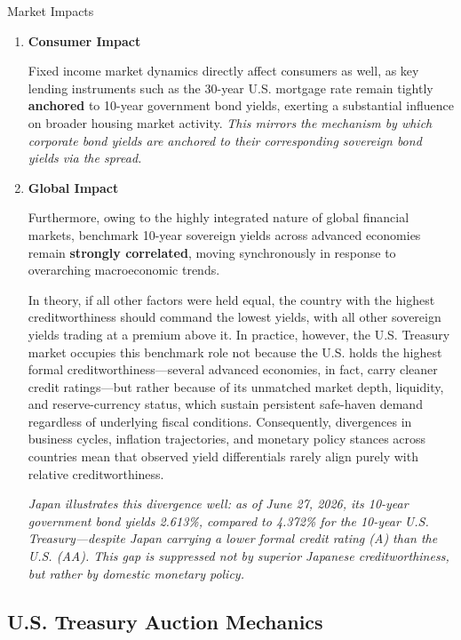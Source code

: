 \documentclass[10pt]{article}
\begin{document}
\begin{core}[label=core:market_impact]{Market Impacts}
\begin{enumerate}
        \item \textbf{Consumer Impact}

        Fixed income market dynamics directly affect consumers as well, as key lending instruments such as the 30-year U.S. mortgage rate remain tightly \textbf{anchored} to 10-year government bond yields, exerting a substantial influence on broader housing market activity. \textit{This mirrors the mechanism by which corporate bond yields are anchored to their corresponding sovereign bond yields via the spread.}

        \item \textbf{Global Impact}

        Furthermore, owing to the highly integrated nature of global financial markets, benchmark 10-year sovereign yields across advanced economies remain \textbf{strongly correlated}, moving synchronously in response to overarching macroeconomic trends.

        In theory, if all other factors were held equal, the country with the highest creditworthiness should command the lowest yields, with all other sovereign yields trading at a premium above it. In practice, however, the U.S. Treasury market occupies this benchmark role not because the U.S. holds the highest formal creditworthiness---several advanced economies, in fact, carry cleaner credit ratings---but rather because of its unmatched market depth, liquidity, and reserve-currency status, which sustain persistent safe-haven demand regardless of underlying fiscal conditions. Consequently, divergences in business cycles, inflation trajectories, and monetary policy stances across countries mean that observed yield differentials rarely align purely with relative creditworthiness.

        \textit{Japan illustrates this divergence well: as of June 27, 2026, its 10-year government bond yields 2.613\%, compared to 4.372\% for the 10-year U.S. Treasury---despite Japan carrying a lower formal credit rating (A) than the U.S. (AA). This gap is suppressed not by superior Japanese creditworthiness, but rather by domestic monetary policy.}

      \end{enumerate}

    \end{core}

  \subsection{U.S. Treasury Auction Mechanics}
\end{document}
